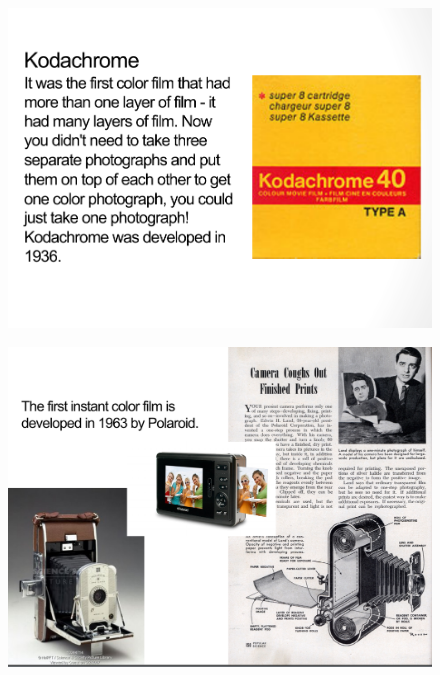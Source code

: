 \documentclass{beamer}
\begin{document}
\begin{frame}
	\begin{figure}
		\centering
		\includegraphics[scale=0.4]{107.jpg}
	\end{figure}
\end{frame}
\begin{frame}
	\begin{figure}
		\centering
		\includegraphics[scale=0.4]{108.jpg}
	\end{figure}
\end{frame}
\end{document}
